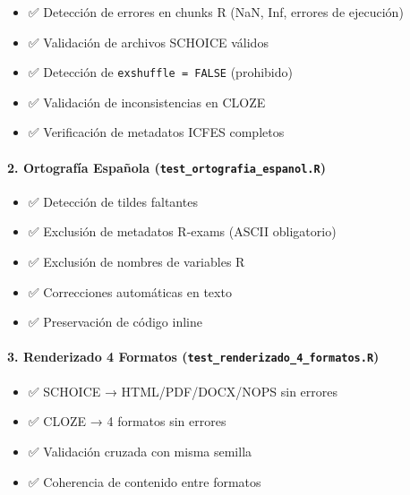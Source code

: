 \documentclass[
]{article}
\providecommand{\tightlist}{%
  \setlength{\itemsep}{0pt}\setlength{\parskip}{0pt}}
\begin{document}
\begin{itemize}
\tightlist
\item
  ✅ Detección de errores en chunks R (NaN, Inf, errores de ejecución)
\item
  ✅ Validación de archivos SCHOICE válidos
\item
  ✅ Detección de \texttt{exshuffle\ =\ FALSE} (prohibido)
\item
  ✅ Validación de inconsistencias en CLOZE
\item
  ✅ Verificación de metadatos ICFES completos
\end{itemize}

\paragraph{\texorpdfstring{2. \textbf{Ortografía Española}
(\texttt{test\_ortografia\_espanol.R})}{2. Ortografía Española (test\_ortografia\_espanol.R)}}\label{ortografuxeda-espauxf1ola-test_ortografia_espanol.r}

\begin{itemize}
\tightlist
\item
  ✅ Detección de tildes faltantes
\item
  ✅ Exclusión de metadatos R-exams (ASCII obligatorio)
\item
  ✅ Exclusión de nombres de variables R
\item
  ✅ Correcciones automáticas en texto
\item
  ✅ Preservación de código inline
\end{itemize}

\paragraph{\texorpdfstring{3. \textbf{Renderizado 4 Formatos}
(\texttt{test\_renderizado\_4\_formatos.R})}{3. Renderizado 4 Formatos (test\_renderizado\_4\_formatos.R)}}\label{renderizado-4-formatos-test_renderizado_4_formatos.r}

\begin{itemize}
\tightlist
\item
  ✅ SCHOICE → HTML/PDF/DOCX/NOPS sin errores
\item
  ✅ CLOZE → 4 formatos sin errores
\item
  ✅ Validación cruzada con misma semilla
\item
  ✅ Coherencia de contenido entre formatos
\end{itemize}
\end{document}
